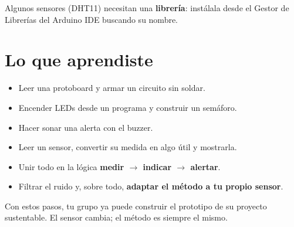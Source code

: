 \documentclass[10pt,letterpaper]{article}
\begin{document}
\begin{ojo}Algunos sensores (DHT11) necesitan una \textbf{librería}: instálala desde el Gestor de
Librerías del Arduino IDE buscando su nombre.\end{ojo}

\section{Lo que aprendiste}
\begin{itemize}
\item Leer una protoboard y armar un circuito sin soldar.
\item Encender LEDs desde un programa y construir un semáforo.
\item Hacer sonar una alerta con el buzzer.
\item Leer un sensor, convertir su medida en algo útil y mostrarla.
\item Unir todo en la lógica \textbf{medir $\rightarrow$ indicar $\rightarrow$ alertar}.
\item Filtrar el ruido y, sobre todo, \textbf{adaptar el método a tu propio sensor}.
\end{itemize}

\vspace{2mm}
\begin{objetivo}Con estos pasos, tu grupo ya puede construir el prototipo de su proyecto
sustentable. El sensor cambia; el método es siempre el mismo.\end{objetivo}
\end{document}
